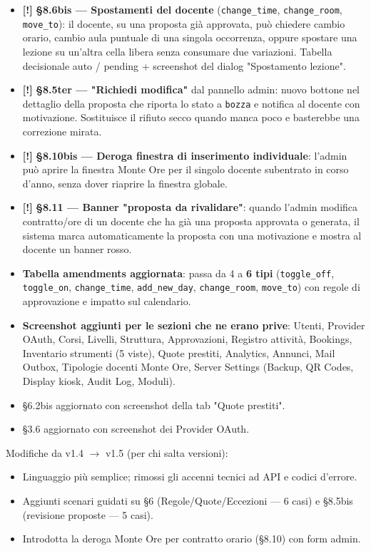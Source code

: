 \documentclass[11pt,a4paper]{article}
\begin{document}
\begin{itemize}
  \item \textbf{[!]} \textbf{§8.6bis --- Spostamenti del docente} (\texttt{change\_time}, \texttt{change\_room}, \texttt{move\_to}): il docente, su una proposta già approvata, può chiedere cambio orario, cambio aula puntuale di una singola occorrenza, oppure spostare una lezione su un'altra cella libera senza consumare due variazioni. Tabella decisionale auto / pending + screenshot del dialog "Spostamento lezione".
  \item \textbf{[!]} \textbf{§8.5ter --- "Richiedi modifica"} dal pannello admin: nuovo bottone nel dettaglio della proposta che riporta lo stato a \texttt{bozza} e notifica al docente con motivazione. Sostituisce il rifiuto secco quando manca poco e basterebbe una correzione mirata.
  \item \textbf{[!]} \textbf{§8.10bis --- Deroga finestra di inserimento individuale}: l'admin può aprire la finestra Monte Ore per il singolo docente subentrato in corso d'anno, senza dover riaprire la finestra globale.
  \item \textbf{[!]} \textbf{§8.11 --- Banner "proposta da rivalidare"}: quando l'admin modifica contratto/ore di un docente che ha già una proposta approvata o generata, il sistema marca automaticamente la proposta con una motivazione e mostra al docente un banner rosso.
  \item \textbf{Tabella amendments aggiornata}: passa da 4 a \textbf{6 tipi} (\texttt{toggle\_off}, \texttt{toggle\_on}, \texttt{change\_time}, \texttt{add\_new\_day}, \texttt{change\_room}, \texttt{move\_to}) con regole di approvazione e impatto sul calendario.
  \item \textbf{Screenshot aggiunti per le sezioni che ne erano prive}: Utenti, Provider OAuth, Corsi, Livelli, Struttura, Approvazioni, Registro attività, Bookings, Inventario strumenti (5 viste), Quote prestiti, Analytics, Annunci, Mail Outbox, Tipologie docenti Monte Ore, Server Settings (Backup, QR Codes, Display kiosk, Audit Log, Moduli).
  \item §6.2bis aggiornato con screenshot della tab "Quote prestiti".
  \item §3.6 aggiornato con screenshot dei Provider OAuth.
\end{itemize}

Modifiche da v1.4 $\rightarrow$ v1.5 (per chi salta versioni):

\begin{itemize}
  \item Linguaggio più semplice; rimossi gli accenni tecnici ad API e codici d'errore.
  \item Aggiunti scenari guidati su §6 (Regole/Quote/Eccezioni --- 6 casi) e §8.5bis (revisione proposte --- 5 casi).
  \item Introdotta la deroga Monte Ore per contratto orario (§8.10) con form admin.
\end{itemize}
\end{document}
